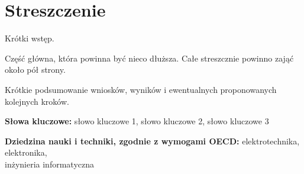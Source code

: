 \chapter*{Streszczenie}

Krótki wstęp.

Część główna, która powinna być nieco dłuższa. Całe streszcznie powinno
zająć około pół strony.

Krótkie podsumowanie wniosków, wyników i ewentualnych proponowanych
kolejnych kroków.

\bigskip
\noindent
\textbf{Słowa kluczowe:} słowo kluczowe 1, słowo kluczowe 2, słowo
kluczowe 3

\bigskip
\noindent
\textbf{Dziedzina nauki i techniki, zgodnie z wymogami OECD:}
elektrotechnika, elektronika, \\ inżynieria informatyczna
